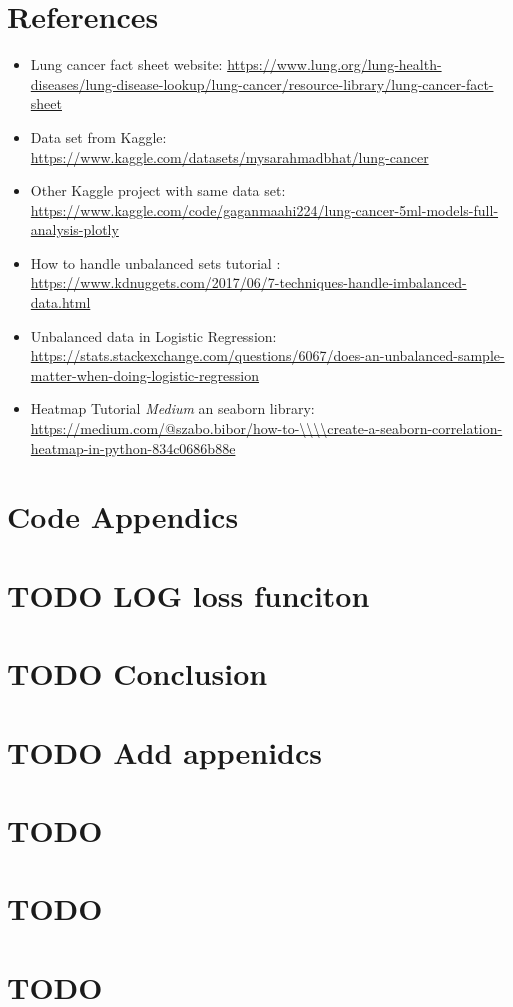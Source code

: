 \documentclass[a4paper,12pt]{article}
\begin{document}
\section{References}
\label{sec:org2247390}
\begin{itemize}
\item\relax [1] Lung cancer fact sheet website:  \url{https://www.lung.org/lung-health-diseases/lung-disease-lookup/lung-cancer/resource-library/lung-cancer-fact-sheet}
\end{itemize}






\begin{itemize}
\item\relax [1] Data set from Kaggle: \url{https://www.kaggle.com/datasets/mysarahmadbhat/lung-cancer}

\item\relax [2] Other Kaggle project with same data set: \url{https://www.kaggle.com/code/gaganmaahi224/lung-cancer-5ml-models-full-analysis-plotly}

\item\relax [3] How to handle unbalanced sets tutorial :
\url{https://www.kdnuggets.com/2017/06/7-techniques-handle-imbalanced-data.html}

\item\relax [4] Unbalanced data in Logistic Regression: \url{https://stats.stackexchange.com/questions/6067/does-an-unbalanced-sample-matter-when-doing-logistic-regression}

\item\relax [5] Heatmap Tutorial \emph{Medium} an seaborn library: \url{https://medium.com/@szabo.bibor/how-to-\\\\create-a-seaborn-correlation-heatmap-in-python-834c0686b88e}
\end{itemize}


\section{Code Appendics}
\label{sec:org6df2ef5}
\section{{\bfseries\sffamily TODO} LOG loss funciton}
\label{sec:org52c445e}
\section{{\bfseries\sffamily TODO} Conclusion}
\label{sec:org0dd9ae8}
\section{{\bfseries\sffamily TODO} Add appenidcs}
\label{sec:org49a059a}
\section{{\bfseries\sffamily TODO} }
\label{sec:org45c1521}
\section{{\bfseries\sffamily TODO} }
\label{sec:orgbf3a721}
\section{{\bfseries\sffamily TODO} }
\label{sec:org4a04629}
\end{document}

